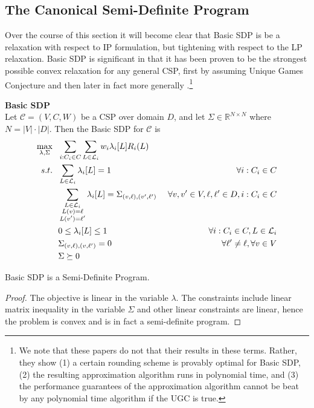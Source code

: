 \subsection{The Canonical Semi-Definite Program}

Over the course of this section it will become clear that Basic SDP is be a relaxation with respect to IP formulation, but tightening with respect to the LP relaxation. Basic SDP is significant in that it has been proven to be the strongest possible convex relaxation for any general CSP, first by assuming Unique Games Conjecture \cite{Rag08} and then later in fact more generally \cite{nphard}.\footnote{We note that these papers do not that their results in these terms. Rather, they show (1) a certain rounding scheme is provably optimal for Basic SDP, (2) the resulting approximation algorithm runs in polynomial time, and (3) the performance guarantees of the approximation algorithm cannot be beat by any polynomial time algorithm if the UGC is true.}

\begin{definition}\textbf{Basic SDP} \\
Let $\mathcal{C} = (V,C,W)$ be a CSP over domain $D$, and let $\Sigma \in \mathbb{R}^{N \times N}$ where $N = |V| \cdot |D|$. Then the Basic SDP for $\mathcal{C}$ is
\begin{alignat}{2}
\max_{\lambda, \Sigma} ~&~ \sum_{i : C_i \in C} \sum_{L \in \mathcal{L}_i}   w_i\lambda_i[L] R_i(L) & \\
s.t. ~ & ~ \sum_{L \in \mathcal{L}_i} \lambda_i[L] = 1  & \forall i : C_i \in C \label{eq:SDPlambdaSum} \\
     ~ & ~ \sum_{\substack {L\in \mathcal{L}_{i}\\ L(v) = \ell\\ L(v')=\ell'} }\lambda_{i}[L]  = \Sigma_{\left(v, \ell\right),\left(v', \ell'\right)}  &~\forall v,v' \in V, \ell,\ell' \in D, i : C_i \in C \label{eq:SDPtiePSD}\\
     ~ & ~ 0 \leq \lambda_i[L] \leq 1  & \forall  i : C_i \in C, L \in \mathcal{L}_i  \label{eq:SDPlambdaNonNeg} \\ 
     ~& ~ \Sigma_{\left(v, \ell\right),\left(v, \ell'\right)} = 0 & \forall \ell' \neq \ell,  \forall v \in V\\
     ~ & ~ \Sigma \succeq 0& \label{eq:SDPPSD}
\end{alignat}
\end{definition}

\begin{theorem}
Basic SDP is a Semi-Definite Program.
\end{theorem}
\begin{proof}
The objective is linear in the variable $\lambda$. The constraints include linear matrix inequality in the variable $\Sigma$ and other linear constraints are linear, hence the problem is convex and is in fact a semi-definite program.
\end{proof}


